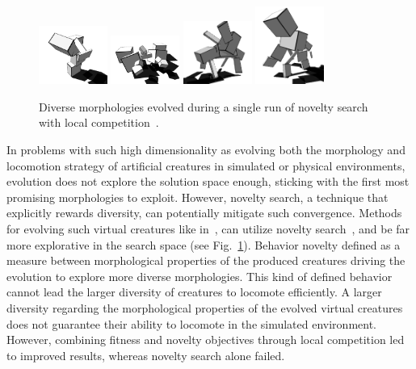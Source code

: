 \begin{figure}[t!]
\centering
\includegraphics[width=0.2\textwidth]{../Figures/Misc/nov1.png}
\includegraphics[width=0.2\textwidth]{../Figures/Misc/nov2.png}
\includegraphics[width=0.2\textwidth]{../Figures/Misc/nov3.png}
\includegraphics[width=0.2\textwidth]{../Figures/Misc/nov4.png}
\caption{Diverse morphologies evolved during a single run of novelty search with local competition~\citep{lehman2011evolving}.}
\label{fig:noveltySims}
\end{figure}

In problems with such high dimensionality as evolving both the morphology and locomotion strategy of artificial creatures in simulated or physical environments, evolution does not explore the solution space enough, sticking with the first most promising morphologies to exploit. However, novelty search, a technique that explicitly rewards diversity, can potentially mitigate such convergence. Methods for evolving such virtual creatures like in~\citep{sims1994evolving}, can utilize novelty search~\citep{lehman2011evolving}, and be far more explorative in the search space (see Fig.~\ref{fig:noveltySims}). Behavior novelty defined as a measure between morphological properties of the produced creatures driving the evolution to explore more diverse morphologies. This kind of defined behavior cannot lead the larger diversity of creatures to locomote efficiently. A larger diversity regarding the morphological properties of the evolved virtual creatures does not guarantee their ability to locomote in the simulated environment. However, combining fitness and novelty objectives through local competition led to improved results, whereas novelty search alone failed. 

